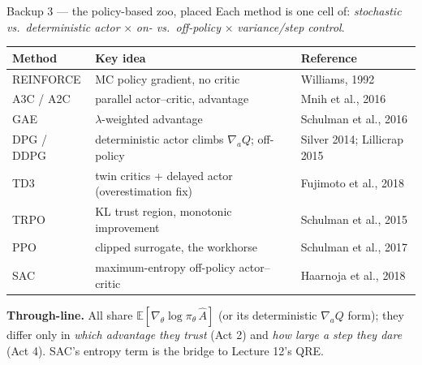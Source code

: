 \documentclass[10pt, aspectratio=169]{beamer}
\begin{document}
\begin{frame}{Backup 3 --- the policy-based zoo, placed}
\footnotesize
Each method is one cell of: \emph{stochastic vs.\ deterministic actor} $\times$ \emph{on- vs.\ off-policy} $\times$ \emph{variance/step control}.
\medskip
\begin{center}\scriptsize\renewcommand{\arraystretch}{1.4}
\begin{tabular}{l|l|l}
\textbf{Method} & \textbf{Key idea} & \textbf{Reference} \\
\hline
REINFORCE & MC policy gradient, no critic & Williams, 1992 \\
A3C / A2C & parallel actor--critic, advantage & Mnih et al., 2016 \\
GAE & $\lambda$-weighted advantage & Schulman et al., 2016 \\
DPG / DDPG & deterministic actor climbs $\nabla_a Q$; off-policy & Silver 2014; Lillicrap 2015 \\
TD3 & twin critics + delayed actor (overestimation fix) & Fujimoto et al., 2018 \\
TRPO & KL trust region, monotonic improvement & Schulman et al., 2015 \\
PPO & clipped surrogate, the workhorse & Schulman et al., 2017 \\
SAC & maximum-entropy off-policy actor--critic & Haarnoja et al., 2018 \\
\end{tabular}
\end{center}
\medskip
\textbf{Through-line.} All share $\mathbb{E}[\nabla_\theta\log\pi_\theta\,\hat A]$ (or its deterministic $\nabla_a Q$ form); they differ only in \emph{which advantage they trust} (Act 2) and \emph{how large a step they dare} (Act 4). SAC's entropy term is the bridge to Lecture 12's QRE.
\end{frame}
\end{document}

